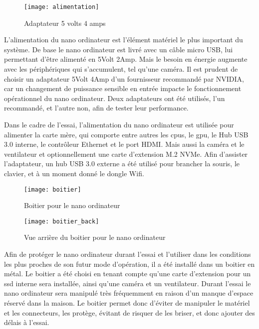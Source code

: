 \begin{figure}[H]
    \centering
    \texttt{[image: alimentation]}
    \caption{Adaptateur 5 volts 4 amps}
    \label{fig:alimenation}
\end{figure}
\par L'alimentation du nano ordinateur est l'élément matériel le plus important du système. De base le nano ordinateur est livré avec un câble micro USB, lui permettant d'être alimenté en 5Volt 2Amp. Mais le besoin en énergie augmente avec les périphériques qui s'accumulent, tel qu'une caméra. Il est prudent de choisir un adaptateur 5Volt 4Amp d'un fournisseur recommandé par NVIDIA, car un changement de puissance sensible en entrée impacte le fonctionnement opérationnel du nano ordinateur. Deux adaptateurs ont été utilisés, l'un recommandé, et l'autre non, afin de tester leur performance. 
\par Dans le cadre de l'essai, l'alimentation du nano ordinateur est utilisée pour alimenter la carte mère, qui comporte entre autres les \acrshort{cpu}s, le \acrshort{gpu}, le Hub USB 3.0 interne, le contrôleur Ethernet et le port HDMI. Mais aussi la caméra et  le ventilateur et optionnellement une carte d'extension M.2 NVMe. Afin d'assister l'adaptateur, un hub USB 3.0 externe a été utilisé pour brancher la souris, le clavier, et à un moment donné le dongle Wifi.
\begin{figure}[H]
    \centering
    \texttt{[image: boitier]}
    \caption{Boitier pour le nano ordinateur}
    \label{fig:boitier}
\end{figure}
\begin{figure}[H]
    \centering
    \texttt{[image: boitier\_back]}
    \caption{Vue arrière du boitier pour le nano ordinateur}
    \label{fig:boitier_arriere}
\end{figure}
\par Afin de protéger le nano ordinateur durant l'essai et l'utiliser dans les conditions les plus proches de son futur mode d'opération, il a été installé dans un boitier en métal. Le boitier a été choisi en tenant compte qu'une carte d'extension pour un \acrshort{ssd} interne sera installée, ainsi qu'une caméra et un ventilateur. Durant l'essai le nano ordinateur sera manipulé très fréquemment en raison d'un manque d'espace réservé dans la maison. Le boitier permet donc d'éviter de manipuler le matériel et les connecteurs, les protège, évitant de risquer de les briser, et donc ajouter des délais à l'essai. 

